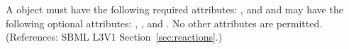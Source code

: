 A \Reaction object must have the following required attributes: 
,  and 
and may have the following optional attributes:
, ,  and 
.  No other attributes are permitted.  
(References: SBML L3V1 Section~\ref{sec:reactions}.)
